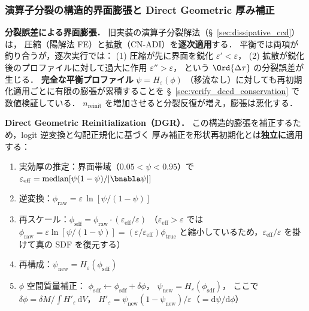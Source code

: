 \subsubsection{演算子分裂の構造的界面膨張と Direct Geometric 厚み補正}
\label{sec:dgr_thickness}

\textbf{分裂誤差による界面膨張．}
旧実装の演算子分裂解法（§~\ref{sec:dissipative_ccd}）は，
圧縮（陽解法 FE）と拡散（CN-ADI）を\textbf{逐次適用}する．
平衡では両項が釣り合うが，逐次実行では：
(1) 圧縮が先に界面を鋭化 $\varepsilon' < \varepsilon$，
(2) 拡散が鋭化後のプロファイルに対して過大に作用 $\varepsilon'' > \varepsilon$，
という $\Ord{\Delta\tau}$ の分裂誤差が生じる．
\textbf{完全な平衡プロファイル} $\psi = H_\varepsilon(\phi)$
（移流なし）に対しても再初期化適用ごとに有限の膨張が累積することを
§~\ref{sec:verify_dccd_conservation} で数値検証している．
$n_{\mathrm{reinit}}$ を増加させると分裂反復が増え，膨張は悪化する．

\textbf{Direct Geometric Reinitialization（DGR）．}
この構造的膨張を補正するため，logit 逆変換と勾配正規化に基づく
厚み補正を形状再初期化とは\textbf{独立に}適用する：
\begin{enumerate}
  \item 実効厚の推定：界面帯域（$0.05 < \psi < 0.95$）で
    $\varepsilon_{\mathrm{eff}} = \mathrm{median}\!\left[\psi(1-\psi)/|\bnabla\psi|\right]$
  \item 逆変換：$\phi_{\mathrm{raw}} = \varepsilon\,\ln[\psi/(1-\psi)]$
  \item 再スケール：$\phi_{\mathrm{sdf}} = \phi_{\mathrm{raw}} \cdot (\varepsilon_{\mathrm{eff}}/\varepsilon)$
    （$\varepsilon_{\mathrm{eff}}>\varepsilon$ では $\phi_{\mathrm{raw}}
    = \varepsilon\ln[\psi/(1-\psi)] = (\varepsilon/\varepsilon_{\mathrm{eff}})\phi_{\mathrm{true}}$
    と縮小しているため，$\varepsilon_{\mathrm{eff}}/\varepsilon$ を掛けて真の SDF を復元する）
  \item 再構成：$\psi_{\mathrm{new}} = H_\varepsilon(\phi_{\mathrm{sdf}})$
  \item $\phi$ 空間質量補正：
    $\phi_{\mathrm{sdf}} \leftarrow \phi_{\mathrm{sdf}} + \delta\phi$，
    $\psi_{\mathrm{new}} = H_\varepsilon(\phi_{\mathrm{sdf}})$，
    ここで $\delta\phi = \delta M / \displaystyle\int H'_\varepsilon\,\mathrm{d}V$，
    $H'_\varepsilon = \psi_{\mathrm{new}}(1-\psi_{\mathrm{new}})/\varepsilon$（$= \mathrm{d}\psi/\mathrm{d}\phi$）
\end{enumerate}

